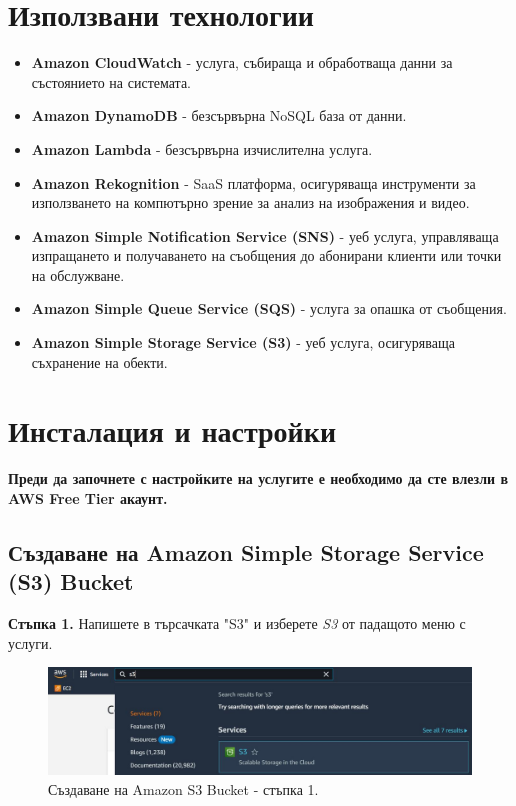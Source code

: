 \documentclass[12pt]{article}
\begin{document}
\clearpage
\pagebreak

\section{Използвани технологии}
\begin{itemize}
    \item \textbf{Amazon CloudWatch} - услуга, събираща и обработваща данни за състоянието на системата.

    \item \textbf{Amazon DynamoDB} - безсървърна NoSQL база от данни.

    \item \textbf{Amazon Lambda} - безсървърна изчислителна услуга.

    \item \textbf{Amazon Rekognition} - SaaS платформа, осигуряваща инструменти за използването на компютърно зрение за анализ на изображения и видео.

    \item \textbf{Amazon Simple Notification Service (SNS)} - уеб услуга, управляваща изпращането и получаването на съобщения до абонирани  клиенти или точки на обслужване.

    \item \textbf{Amazon Simple Queue Service (SQS)} - услуга за опашка от съобщения.
    
    \item \textbf{Amazon Simple Storage Service (S3)} - уеб услуга, осигуряваща съхранение на обекти.
\end{itemize}

\clearpage
\pagebreak

\section{Инсталация и настройки}
\textbf{\hspace{\parindent}Преди да започнете с настройките на услугите е необходимо да сте влезли в AWS Free Tier акаунт.}
\subsection{Създаване на Amazon Simple Storage Service (S3) Bucket}

\noindent\textbf{Стъпка 1.} Напишете в търсачката "S3" и изберете \textit{S3} от падащото меню с услуги.
\begin{figure}[h!]
\centering
    \includegraphics[scale=0.4]{instructions/s3/1.JPG}
  \caption{Създаване на Amazon S3 Bucket - стъпка 1.}
\end{figure}
\end{document}
